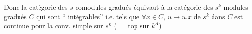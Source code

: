 Donc la catégorie des $s$-comodules gradués équivaut à la catégorie des $s^k$-modules gradués $C$  qui sont `` \uline{intégrables}''
i.e. tels que $\forall x\in C$, $u\longmapsto u.x$ de $s^k$ dans $C$ est continue pour la conv. simple sur $s^k$ ($=$ top  sur $k^A$)
